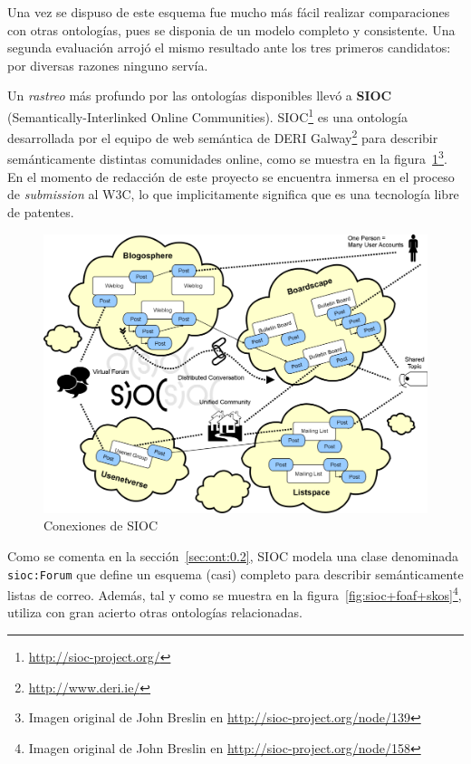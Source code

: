 Una vez se dispuso de este esquema fue mucho más fácil realizar comparaciones
con otras ontologías, pues se disponia de un modelo completo y consistente. Una 
segunda evaluación arrojó el mismo resultado ante los tres primeros candidatos:
por diversas razones ninguno servía.

Un \emph{rastreo} más profundo por las ontologías disponibles llevó a 
\textbf{SIOC}\cite{Breslin2005} (Semantically-Interlinked Online Communities). 
SIOC\footnote{\url{http://sioc-project.org/}} es una ontología desarrollada 
por el equipo de web semántica de DERI Galway\footnote{\url{http://www.deri.ie/}} 
para describir semánticamente distintas comunidades online, como se muestra en
la figura~\ref{fig:siocCloud}\footnote{Imagen original de John Breslin en 
\url{http://sioc-project.org/node/139}}. En el momento de redacción
de este proyecto se encuentra inmersa en el proceso de \emph{submission} al
W3C, lo que implicitamente significa que es una tecnología libre de patentes.

\begin{figure}[H]
	\centering
	\includegraphics[width=12cm]{images/sioc-clouds.png}
	\caption{Conexiones de SIOC}
	\label{fig:siocCloud}
\end{figure}

Como se comenta en la sección~\ref{sec:ont:0.2}, SIOC modela una clase denominada
\texttt{sioc:Forum} que define un esquema (casi) completo para describir
semánticamente listas de correo. Además, tal y como se muestra en la 
figura~\ref{fig:sioc+foaf+skos}\footnote{Imagen original de John Breslin en 
\url{http://sioc-project.org/node/158}}, utiliza con gran acierto otras ontologías 
relacionadas.

